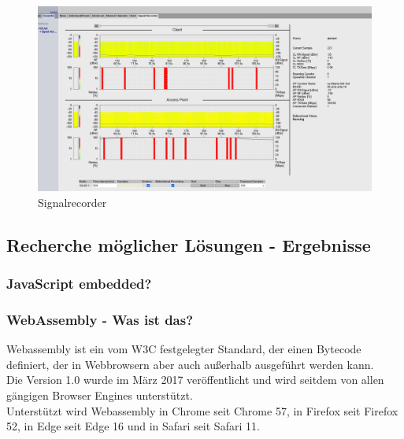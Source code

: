 \begin{figure}[!ht]
        \centering
        \includegraphics[width=\textwidth]{Pictures/Signalrecorder.png}
        \caption{Signalrecorder}
        \label{Signalrecorder}    
\end{figure}

\subsection{Recherche möglicher Lösungen - Ergebnisse}
\subsubsection{JavaScript embedded?}
\subsubsection{WebAssembly - Was ist das?}
Webassembly ist ein vom W3C festgelegter Standard, der einen Bytecode definiert, der in Webbrowsern aber auch außerhalb ausgeführt werden kann. \\
Die Version 1.0 wurde im März 2017 veröffentlicht und wird seitdem von allen gängigen Browser Engines unterstützt. \\
Unterstützt wird Webassembly in Chrome seit Chrome 57, in Firefox seit Firefox 52, in Edge seit Edge 16 und in Safari seit Safari 11. \cite*{caniusewasm} \\
